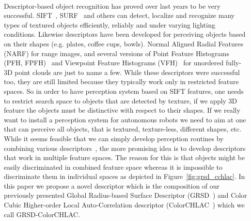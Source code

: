 \documentclass[conference]{sty/IEEEtran}
\begin{document}
\\

Descriptor-based object recognition has proved over last years to be very successful.
SIFT~\cite{lowe04distinctive}, SURF~\cite{surf} and others can
detect, localize and recognize many types of textured objects efficiently, reliably
and under varying lighting conditions. Likewise descriptors have been developed 
for perceiving objects based on their shapes (e.g. plates, coffee cups, bowls).
Normal Aligned Radial Features (NARF)\cite{steder10irosws} for range images, 
and several versions of Point Feature  Histograms (PFH, FPFH)~\cite{Rusu09ICRA} and 
Viewpoint Feature Histograms (VFH)~\cite{vfh} for unordered fully-3D point clouds are just 
to name a few. While these descriptors were successful too, they are still limited because they
typically work only in restricted feature spaces. So in order to have perception system
based on SIFT features, one needs to restrict search space to objects that are detected by
texture, if we apply 3D feature the objects must be distinctive with respect to their shapes. 
If we really want to install a perception system for autonomous robots we need to aim 
at one that can perceive all objects, that is textured, texture-less, different shapes, etc.
While it seems feasible that we can simply develop perception routines by combining
various descriptors~\cite{stueckler10combining, GRSD10Humanoids}, the more promising idea 
is to develop descriptors that work in multiple feature spaces. The reason for this is 
that objects might be easily discriminated in combined feature space whereas it is impossible 
to discriminate them in individual spaces as depicted in Figure~\ref{fig:grsd_cchlac}.
In this paper we propose a novel descriptor which is the composition of our previously 
presented Global Radius-based Surface Descriptor
(GRSD~\cite{GRSD10Humanoids}) and Color Cubic Higher-order Local Auto-Correlation descriptor
(ColorCHLAC~\cite{kanezaki2010tvc}) which we call GRSD-ColorCHLAC.
\end{document}
